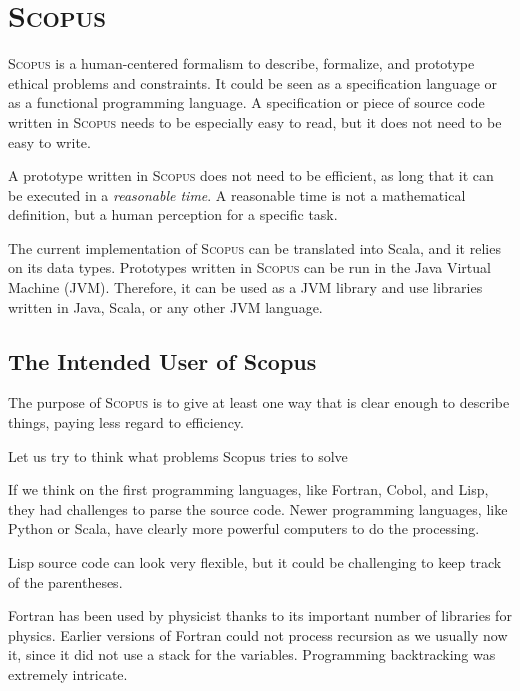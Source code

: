 \documentclass[12pt,a4paper]{article}
\newcommand{\Scopus}{\textsc{Scopus}\xspace}
\begin{document}


    \section{\Scopus}

    \Scopus is a human-centered formalism to describe, formalize, and prototype ethical problems and constraints.
    It could be seen as a specification language or as a functional programming language.
    A specification or piece of source code written in \Scopus needs to be especially easy to read, but it does not need to be easy to write.

    A prototype written in \Scopus does not need to be efficient, as long that it can be executed in a \textit{reasonable time}.
    A reasonable time is not a mathematical definition, but a human perception for a specific task.

    The current implementation of \Scopus can be translated into Scala, and it relies on its data types.
    Prototypes written in \Scopus can be run in the Java Virtual Machine (JVM).
    Therefore, it can be used as a JVM library and use libraries written in Java, Scala, or any other JVM language.

    \subsection{The Intended User of Scopus}

    The purpose of \Scopus is to give at least one way that is clear enough to describe things, paying less regard to efficiency.

    Let us try to think what problems Scopus tries to solve

    If we think on the first programming languages, like Fortran, Cobol, and Lisp, they had challenges to parse the source code.
    Newer programming languages, like Python or Scala, have clearly more powerful computers to do the processing.

    Lisp source code can look very flexible, but it could be challenging to keep track of the parentheses.

    Fortran has been used by physicist thanks to its important number of libraries for physics.
    Earlier versions of Fortran could not process recursion as we usually now it, since it did not use a stack for the variables.
    Programming backtracking was extremely intricate.
\end{document}
